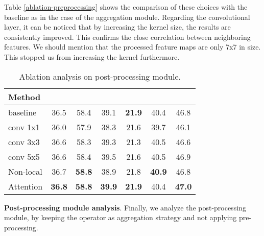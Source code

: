 \documentclass[10pt,conference,a4paper]{IEEEtran}
\begin{document}
Table \ref{ablation-preprocessing} shows the comparison of these choices with the baseline as in the case of the aggregation module.
Regarding the convolutional layer, it can be noticed that by increasing the kernel size, the results are consistently improved.
This confirms the close correlation between neighboring features.
We should mention that the processed feature maps are only 7x7 in size.
This stopped us from increasing the kernel furthermore.



\begin{table}
  \begin{center}
    \begin{tabular}{l|c|c|c|c|c|c}
      Method &  &  &  &  &  &  \\
      \hline\hline
      baseline  & 36.5 & 58.4 & 39.1 & \textbf{21.9} & 40.4 & 46.8 \\
conv 1x1  & 36.0 & 57.9 & 38.3 & 21.6 & 39.7 & 46.1 \\
conv 3x3  & 36.6 & 58.3 & 39.3 & 21.3 & 40.5 & 46.6 \\
conv 5x5  & 36.6 & 58.4 & 39.5 & 21.6 & 40.5 & 46.9 \\
Non-local & 36.7 & \textbf{58.8} & 38.9 & 21.8 & \textbf{40.9} & 46.8 \\
Attention & \textbf{36.8} & \textbf{58.8} & \textbf{39.9} & \textbf{21.9} & 40.4 & \textbf{47.0} \\
    \end{tabular}
  \end{center}
  \caption{Ablation analysis on post-processing module.}
  \label{ablation-postprocessing}
\end{table}

\noindent\textbf{Post-processing module analysis}.
Finally, we analyze the post-processing module, by keeping the  operator as aggregation strategy and not applying pre-processing.
\end{document}
